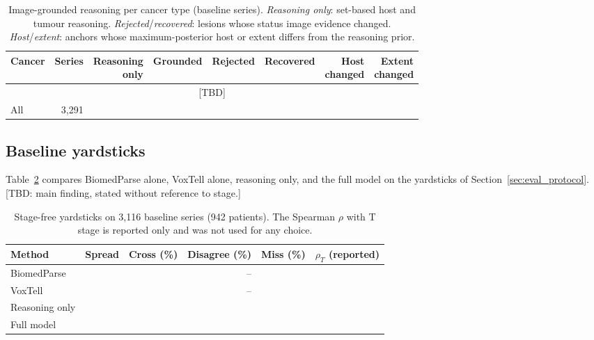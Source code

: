 \documentclass[fleqn,10pt]{olplainarticle}
\begin{document}
\begin{table}[t]
\centering\small
\caption{Image-grounded reasoning per cancer type (baseline series). \emph{Reasoning only}: set-based host and tumour
reasoning. \emph{Rejected}/\emph{recovered}: lesions whose status image evidence changed. \emph{Host}/\emph{extent}: anchors
whose maximum-posterior host or extent differs from the reasoning prior.}
\label{tab:r2_by_type}
\setlength{\tabcolsep}{4pt}\footnotesize
\begin{tabular}{lrrrrrrr}
\hline
Cancer & Series & \shortstack{Reasoning\\only} & Grounded & Rejected & Recovered & \shortstack{Host\\changed} & \shortstack{Extent\\changed}\\
\hline
\multicolumn{8}{c}{[TBD]}\\
\hline
All & 3{,}291 & & & & & & \\
\hline
\end{tabular}
\end{table}

\subsection{Baseline yardsticks}
\label{sec:results_yardsticks}
Table~\ref{tab:yardsticks} compares BiomedParse alone, VoxTell alone, reasoning only, and the full model on the
yardsticks of Section~\ref{sec:eval_protocol}. [TBD: main finding, stated without reference to stage.]

\begin{table}[t]
\centering\small
\caption{Stage-free yardsticks on 3{,}116 baseline series (942 patients). The Spearman $\rho$ with T stage is reported
only and was not used for any choice.}
\label{tab:yardsticks}
\begin{tabular}{lrrrrr}
\hline
Method & Spread & Cross (\%) & Disagree (\%) & Miss (\%) & $\rho_T$ (reported)\\
\hline
BiomedParse & & & -- & & \\
VoxTell & & & -- & & \\
Reasoning only & & & & & \\
Full model & & & & & \\
\hline
\end{tabular}
\end{table}
\end{document}
